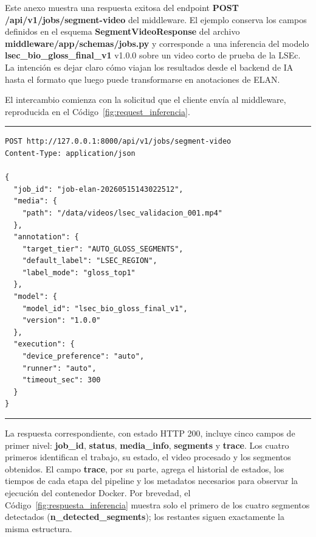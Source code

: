 \documentclass[11pt,a4paper]{article}
\begin{document}
\renewcommand{\thetable}{II.\arabic{table}}
\renewcommand{\theHtable}{anexoII.table.\arabic{table}}
\setcounter{table}{0}
\renewcommand{\thecodigo}{II.\arabic{codigo}}
\renewcommand{\theHcodigo}{anexoII.codigo.\arabic{codigo}}
\setcounter{codigo}{0}
\renewcommand{\thecomando}{II.\arabic{comando}}
\renewcommand{\theHcomando}{anexoII.comando.\arabic{comando}}
\setcounter{comando}{0}
\renewcommand{\thefigure}{II.\arabic{figure}}
\renewcommand{\theHfigure}{anexoII.figure.\arabic{figure}}
\setcounter{figure}{0}

Este anexo muestra una respuesta exitosa del endpoint \textbf{POST /api/v1/jobs/segment-video} del middleware. El ejemplo conserva los campos definidos en el esquema \textbf{SegmentVideoResponse} del archivo \textbf{middleware/app/schemas/jobs.py} y corresponde a una inferencia del modelo \textbf{lsec\_bio\_gloss\_final\_v1} v1.0.0 sobre un video corto de prueba de la LSEc. La intención es dejar claro cómo viajan los resultados desde el backend de IA hasta el formato que luego puede transformarse en anotaciones de ELAN.

El intercambio comienza con la solicitud que el cliente envía al middleware, reproducida en el Código~\ref{fig:request_inferencia}.

\begin{center}
\begin{minipage}{0.96\textwidth}
\hrule
\vspace{0.06cm}
\scriptsize
\begin{Verbatim}[baselinestretch=0.68]
POST http://127.0.0.1:8000/api/v1/jobs/segment-video
Content-Type: application/json

{
  "job_id": "job-elan-20260515143022512",
  "media": {
    "path": "/data/videos/lsec_validacion_001.mp4"
  },
  "annotation": {
    "target_tier": "AUTO_GLOSS_SEGMENTS",
    "default_label": "LSEC_REGION",
    "label_mode": "gloss_top1"
  },
  "model": {
    "model_id": "lsec_bio_gloss_final_v1",
    "version": "1.0.0"
  },
  "execution": {
    "device_preference": "auto",
    "runner": "auto",
    "timeout_sec": 300
  }
}
\end{Verbatim}
\vspace{0.03cm}
\hrule

\label{fig:request_inferencia}
\end{minipage}
\end{center}

La respuesta correspondiente, con estado HTTP 200, incluye cinco campos de primer nivel: \textbf{job\_id}, \textbf{status}, \textbf{media\_info}, \textbf{segments} y \textbf{trace}. Los cuatro primeros identifican el trabajo, su estado, el video procesado y los segmentos obtenidos. El campo \textbf{trace}, por su parte, agrega el historial de estados, los tiempos de cada etapa del pipeline y los metadatos necesarios para observar la ejecución del contenedor Docker. Por brevedad, el Código~\ref{fig:respuesta_inferencia} muestra solo el primero de los cuatro segmentos detectados (\textbf{n\_detected\_segments}); los restantes siguen exactamente la misma estructura.
\end{document}
